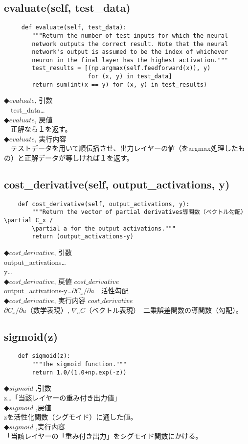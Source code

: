 \documentclass[11pt,a4j,fleqn]{jarticle}
\begin{document}
\subsection{evaluate(self, test\_data)}
\begin{verbatim}
     def evaluate(self, test_data):
        """Return the number of test inputs for which the neural
        network outputs the correct result. Note that the neural
        network's output is assumed to be the index of whichever
        neuron in the final layer has the highest activation."""
        test_results = [(np.argmax(self.feedforward(x)), y)
                        for (x, y) in test_data]
        return sum(int(x == y) for (x, y) in test_results)
\end{verbatim}
◆$evaluate$, 引数 \\
　test\_data… \\
◆$evaluate$, 戻値 \\
　正解なら１を返す。\\
◆$evaluate$, 実行内容 \\
　テストデータを用いて順伝播させ、出力レイヤーの値（をargmax処理したもの）と正解データが等しければ１を返す。
\subsection{cost\_derivative(self, output\_activations, y)}
\begin{verbatim}
    def cost_derivative(self, output_activations, y):
        """Return the vector of partial derivatives導関数（ベクトル勾配） \partial C_x /
        \partial a for the output activations."""
        return (output_activations-y)
\end{verbatim}
◆$cost\_derivative$, 引数 \\
output\_activations…\\
y…\\
◆$cost\_derivative$, 戻値 $cost\_derivative$\\
output\_activations-y…$\partial C_x / \partial a$　活性勾配\\
◆$cost\_derivative$, 実行内容 $cost\_derivative$\\
$\partial C_x / \partial a$（数学表現）, $\nabla_a C$（ベクトル表現）　二乗誤差関数の導関数（勾配）。
\subsection{sigmoid(z)}
\begin{verbatim}
    def sigmoid(z):
        """The sigmoid function."""
        return 1.0/(1.0+np.exp(-z))
\end{verbatim}
◆$sigmoid$ ,引数 \\
z…「当該レイヤーの重み付き出力値」\\
◆$sigmoid$ ,戻値 \\
zを活性化関数（シグモイド）に通した値。\\
◆$sigmoid$ ,実行内容 \\
「当該レイヤーの「重み付き出力」をシグモイド関数にかける。
\end{document}
